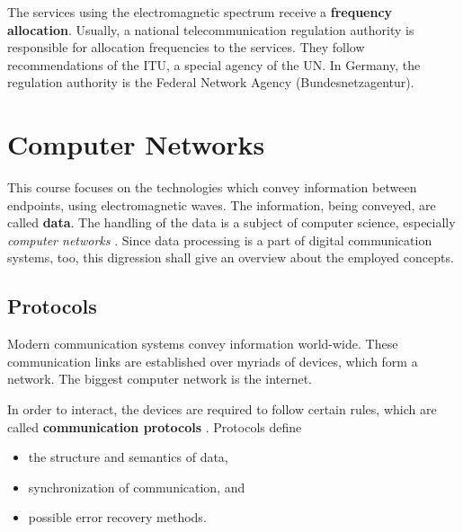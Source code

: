 \begin{refsection}
The services using the electromagnetic spectrum receive a  \textbf{frequency allocation}. Usually, a national telecommunication regulation authority is responsible for allocation frequencies to the services. They follow recommendations of the \ac{ITU}, a special agency of the \ac{UN}. In Germany, the regulation authority is the Federal Network Agency (Bundesnetzagentur).

\section{Computer Networks}


This course focuses on the technologies which convey information between endpoints, using electromagnetic waves. The information, being conveyed, are called \textbf{data}. The handling of the data is a subject of computer science, especially \emph{computer networks} . Since data processing is a part of digital communication systems, too, this digression shall give an overview about the employed concepts.


\subsection{Protocols}

Modern communication systems convey information world-wide. These communication links are established over myriads of devices, which form a network. The biggest computer network is the internet.

In order to interact, the devices are required to follow certain rules, which are called \textbf{communication protocols} . Protocols define
\begin{itemize}
	\item the structure and semantics of data,
	\item synchronization of communication, and
	\item possible error recovery methods.
\end{itemize}


\end{refsection}
